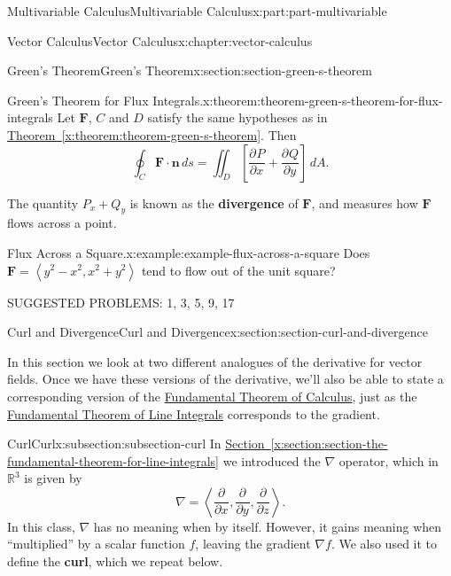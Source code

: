 \documentclass[twoside,10pt,]{book}
\newcommand{\xreffont}{\relax}
\newcommand{\terminology}[1]{\textbf{#1}}
\numberwithin{equation}{part}
\newcommand{\RR}{\mathbb{R}}
\newcommand{\grad}{\nabla}
\newcommand{\del}{\nabla}
\newcommand{\vb}[1]{\mathbf{#1}}
\newcommand{\pdv}[3][]{\dfrac{\partial^{#1} #2}{\partial #3^{#1}}}
\newcommand{\dotprod}[1]{\left\langle #1 \right\rangle}
\newcommand{\brackets}[1]{\left[ #1 \right]}
\begin{document}
\begin{partptx}{Multivariable Calculus}{}{Multivariable Calculus}{}{}{x:part:part-multivariable}
\begin{chapterptx}{Vector Calculus}{}{Vector Calculus}{}{}{x:chapter:vector-calculus}
\begin{sectionptx}{Green's Theorem}{}{Green's Theorem}{}{}{x:section:section-green-s-theorem}
\begin{theorem}{Green's Theorem for Flux Integrals.}{}{x:theorem:theorem-green-s-theorem-for-flux-integrals}
%
Let \(\vb{F}\), \(C\) and \(D\) satisfy the same hypotheses as in \hyperref[x:theorem:theorem-green-s-theorem]{Theorem~{\xreffont\ref{x:theorem:theorem-green-s-theorem}}}. Then%
\begin{equation*}
\oint_{C}\vb{F}\cdot\vb{n}\,ds = \iint_{D}\brackets{\pdv{P}{x} + \pdv{Q}{y}}\,dA\text{.}
\end{equation*}
%
\end{theorem}
The quantity \(P_{x} + Q_{y}\) is known as the \terminology{divergence} of \(\vb{F}\), and measures how \(\vb{F}\) flows across a point.%
\begin{example}{Flux Across a Square.}{x:example:example-flux-across-a-square}%
Does \(\vb{F} = \dotprod{y^{2} - x^{2}, x^{2} + y^{2}}\) tend to flow out of the unit square?%
\end{example}
SUGGESTED PROBLEMS: 1, 3, 5, 9, 17%
\end{sectionptx}
%
%
\typeout{************************************************}
\typeout{************************************************}
%
\begin{sectionptx}{Curl and Divergence}{}{Curl and Divergence}{}{}{x:section:section-curl-and-divergence}
\begin{introduction}{}%
In this section we look at two different analogues of the derivative for vector fields. Once we have these versions of the derivative, we'll also be able to state a corresponding version of the \hyperref[x:theorem:theorem-fundamental-theorem-of-calculus]{Fundamental Theorem of Calculus}, just as the \hyperref[x:theorem:theorem-fundamental-theorem-line-integrals]{Fundamental Theorem of Line Integrals} corresponds to the gradient.%
\end{introduction}%
%
%
\typeout{************************************************}
\typeout{************************************************}
%
\begin{subsectionptx}{Curl}{}{Curl}{}{}{x:subsection:subsection-curl}
In \hyperref[x:section:section-the-fundamental-theorem-for-line-integrals]{Section~{\xreffont\ref{x:section:section-the-fundamental-theorem-for-line-integrals}}} we introduced the \(\del\) operator, which in \(\RR^{3}\) is given by%
\begin{equation*}
\del = \dotprod{\pdv{}{x}, \pdv{}{y}, \pdv{}{z}}\text{.}
\end{equation*}
In this class, \(\del\) has no meaning when by itself. However, it gains meaning when ``multiplied'' by a scalar function \(f\), leaving the gradient \(\grad f\). We also used it to define the \terminology{curl}, which we repeat below.%

\end{subsectionptx}
\end{sectionptx}
\end{chapterptx}
\end{partptx}
\end{document}
